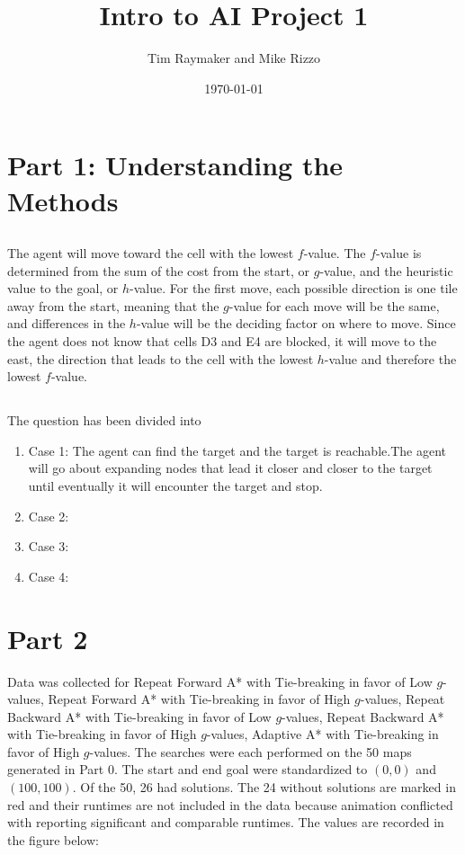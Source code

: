 \documentclass[a4paper,12pt]{article}
\begin{document}
\title{Intro to AI Project 1}
\author{Tim Raymaker and Mike Rizzo}
\date{\today}
\maketitle

\section{Part 1: Understanding the Methods}
\subsection{}
The agent will move toward the cell with the lowest $f$-value. The $f$-value is determined from the sum of the cost from the start, or $g$-value,  and the heuristic value to the goal, or $h$-value. For the first move, each possible direction is one tile away from the start, meaning that the $g$-value for each move will be the same, and differences in the $h$-value will be the deciding factor on where to move. Since the agent does not know that cells D3 and E4 are blocked, it will move to the east, the direction that leads to the cell with the lowest $h$-value and therefore the lowest $f$-value. 
\subsection{}
The question has been divided into 
\begin{enumerate}
	\item Case 1: The agent can find the target and the target is reachable.\newline The agent will go about expanding nodes that lead it closer and closer to the target until eventually it will encounter the target and stop. 
	\item Case 2: 
	\item Case 3:
	\item Case 4:
\end{enumerate}

\section{Part 2}
Data was collected for Repeat Forward A* with Tie-breaking in favor of Low $g$-values, Repeat Forward A* with Tie-breaking in favor of High $g$-values,  Repeat Backward A* with Tie-breaking in favor of Low $g$-values, Repeat Backward A* with Tie-breaking in favor of High $g$-values, Adaptive A* with Tie-breaking in favor of High $g$-values. The searches were each performed on the 50 maps generated in Part 0. The start and end goal were standardized to $(0,0)$ and $(100,100)$. Of the 50, 26 had solutions. The 24 without solutions are marked in red and their runtimes are not included in the data because animation conflicted with reporting significant and comparable runtimes. The values are recorded in the figure below:
\end{document}
